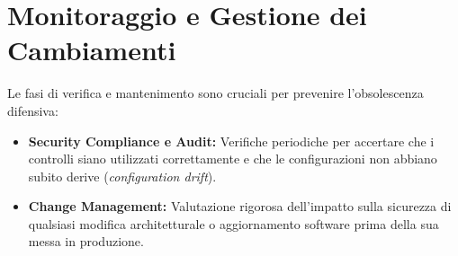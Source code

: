 \section{Monitoraggio e Gestione dei Cambiamenti}
Le fasi di verifica e mantenimento sono cruciali per prevenire l'obsolescenza difensiva:
\begin{itemize}
    \item \textbf{Security Compliance e Audit:} Verifiche periodiche per accertare che i controlli siano utilizzati correttamente e che le configurazioni non abbiano subito derive (\textit{configuration drift}).
    \item \textbf{Change Management:} Valutazione rigorosa dell'impatto sulla sicurezza di qualsiasi modifica architetturale o aggiornamento software prima della sua messa in produzione.
\end{itemize}